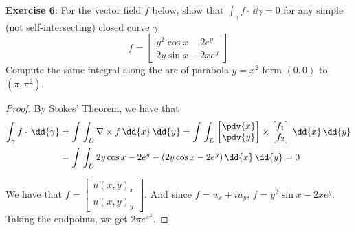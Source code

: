 \documentclass{article}
\begin{document}
\textbf{Exercise 6}: For the vector field $f$ below, show that $\int_{\gamma}^{} f \cdot \, \dd{\gamma}  = 0$ for any simple (not self-intersecting) closed curve $\gamma$.
    \begin{equation*}
        f = \begin{bmatrix}
            y^{2}\cos{x} - 2e^{y} \\
            2y\sin{x} - 2xe^{y}     
        \end{bmatrix}
    \end{equation*}
Compute the same integral along the arc of parabola $y = x^{2}$ form $(0, 0)$ to $(\pi, \pi^{2})$.
    \begin{proof}
        By Stokes' Theorem, we have that 
            \begin{align*}
                \int_{\gamma}^{} f \cdot \, \dd{\gamma} &= \int_{}^{} \int_{D}^{} \nabla \times f \, \dd{x}  \, \dd{y} = \int_{}^{} \int_{D}^{} \begin{bmatrix}
                    \pdv{x} \\
                    \pdv{y}   
                \end{bmatrix} \times \begin{bmatrix}
                    f_{1} \\
                    f_{2}   
                \end{bmatrix} \, \dd{x}  \, \dd{y}  \\
                &= \int_{}^{} \int_{D}^{} 2y\cos{x} - 2e^{y} - (2y\cos{x} - 2e^{y}) \, \dd{x}  \, \dd{y} = 0
            \end{align*}

        We have that $f = \begin{bmatrix}
            u(x, y)_{x}  \\
            u(x, y)_{y}   
        \end{bmatrix}$. And since $f = u_{x} + iu_{y}$, $f = y^{2}\sin{x} - 2xe^{y}$. Taking the endpoints, we get $2\pi e^{\pi^{2}}$.
    \end{proof}
\end{document}
